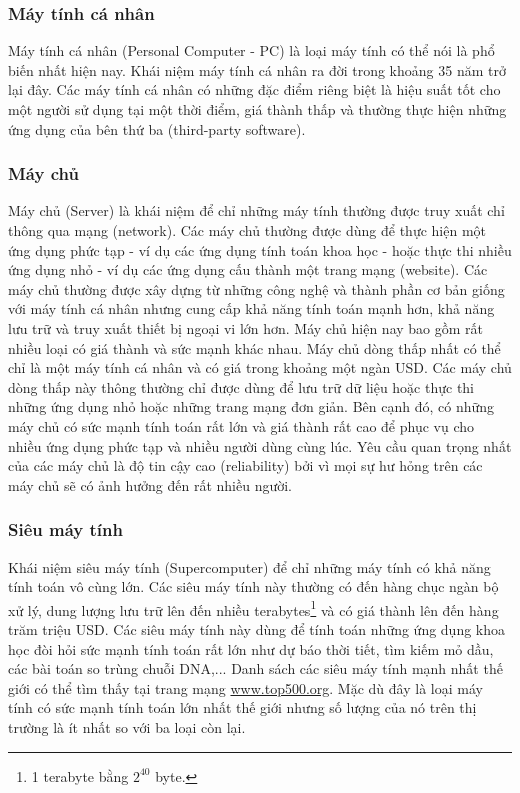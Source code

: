 \subsubsection{Máy tính cá nhân}
Máy tính cá nhân (Personal Computer - PC) là loại máy tính có thể nói là phổ biến nhất hiện nay. Khái niệm máy tính cá nhân ra đời trong khoảng 35 năm trở lại đây. Các máy tính cá nhân có những đặc điểm riêng biệt là hiệu suất tốt cho một người sử dụng tại một thời điểm, giá thành thấp và thường thực hiện những ứng dụng của bên thứ ba (third-party software).

\subsubsection{Máy chủ}
Máy chủ (Server) là khái niệm để chỉ những máy tính thường được truy xuất chỉ thông qua mạng (network). Các máy chủ thường được dùng để thực hiện một ứng dụng phức tạp - ví dụ các ứng dụng tính toán khoa học - hoặc thực thi nhiều ứng dụng nhỏ - ví dụ các ứng dụng cấu thành một trang mạng (website). Các máy chủ thường được xây dựng từ những công nghệ và thành phần cơ bản giống với máy tính cá nhân nhưng cung cấp khả năng tính toán mạnh hơn, khả năng lưu trữ và truy xuất thiết bị ngoại vi lớn hơn. Máy chủ hiện nay bao gồm rất nhiều loại có giá thành và sức mạnh khác nhau. Máy chủ dòng thấp nhất có thể chỉ là một máy tính cá nhân và có giá trong khoảng một ngàn USD. Các máy chủ dòng thấp này thông thường chỉ được dùng để lưu trữ dữ liệu hoặc thực thi những ứng dụng nhỏ hoặc những trang mạng đơn giản. Bên cạnh đó, có những máy chủ có sức mạnh tính toán rất lớn và giá thành rất cao để phục vụ cho nhiều ứng dụng phức tạp và nhiều người dùng cùng lúc. Yêu cầu quan trọng nhất của các máy chủ là độ tin cậy cao (reliability) bởi vì mọi sự hư hỏng trên các máy chủ sẽ có ảnh hưởng đến rất nhiều người.

\subsubsection{Siêu máy tính}
Khái niệm siêu máy tính (Supercomputer) để chỉ những máy tính có khả năng tính toán vô cùng lớn. Các siêu máy tính này thường có đến hàng chục ngàn bộ xử lý, dung lượng lưu trữ lên đến nhiều terabytes\footnote{1 terabyte bằng $2^{40}$ byte.} và có giá thành lên đến hàng trăm triệu USD. Các siêu máy tính này dùng để tính toán những ứng dụng khoa học đòi hỏi sức mạnh tính toán rất lớn như dự báo thời tiết, tìm kiếm mỏ dầu, các bài toán so trùng chuỗi DNA,... Danh sách các siêu máy tính mạnh nhất thế giới có thể tìm thấy tại trang mạng \url{www.top500.org}. Mặc dù đây là loại máy tính có sức mạnh tính toán lớn nhất thế giới nhưng số lượng của nó trên thị trường là ít nhất so với ba loại còn lại.

